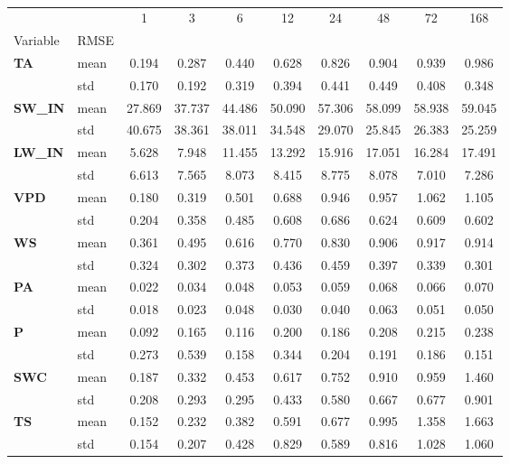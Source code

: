 \begin{table}
\centering
\caption{\CapGapLen}
\label{gap_len}
\begin{tabular}{p{2.1cm}l|cccccccc}
\toprule
 &  & 1 & 3 & 6 & 12 & 24 & 48 & 72 & 168 \\
Variable & RMSE &  &  &  &  &  &  &  &  \\
\midrule
\multirow[c]{2}{*}{\parbox{2.1cm}{\textbf{TA}}} & mean & 0.194 & 0.287 & 0.440 & 0.628 & 0.826 & 0.904 & 0.939 & 0.986 \\
 & std & 0.170 & 0.192 & 0.319 & 0.394 & 0.441 & 0.449 & 0.408 & 0.348 \\
\cline{1-10}
\multirow[c]{2}{*}{\parbox{2.1cm}{\textbf{SW\_IN}}} & mean & 27.869 & 37.737 & 44.486 & 50.090 & 57.306 & 58.099 & 58.938 & 59.045 \\
 & std & 40.675 & 38.361 & 38.011 & 34.548 & 29.070 & 25.845 & 26.383 & 25.259 \\
\cline{1-10}
\multirow[c]{2}{*}{\parbox{2.1cm}{\textbf{LW\_IN}}} & mean & 5.628 & 7.948 & 11.455 & 13.292 & 15.916 & 17.051 & 16.284 & 17.491 \\
 & std & 6.613 & 7.565 & 8.073 & 8.415 & 8.775 & 8.078 & 7.010 & 7.286 \\
\cline{1-10}
\multirow[c]{2}{*}{\parbox{2.1cm}{\textbf{VPD}}} & mean & 0.180 & 0.319 & 0.501 & 0.688 & 0.946 & 0.957 & 1.062 & 1.105 \\
 & std & 0.204 & 0.358 & 0.485 & 0.608 & 0.686 & 0.624 & 0.609 & 0.602 \\
\cline{1-10}
\multirow[c]{2}{*}{\parbox{2.1cm}{\textbf{WS}}} & mean & 0.361 & 0.495 & 0.616 & 0.770 & 0.830 & 0.906 & 0.917 & 0.914 \\
 & std & 0.324 & 0.302 & 0.373 & 0.436 & 0.459 & 0.397 & 0.339 & 0.301 \\
\cline{1-10}
\multirow[c]{2}{*}{\parbox{2.1cm}{\textbf{PA}}} & mean & 0.022 & 0.034 & 0.048 & 0.053 & 0.059 & 0.068 & 0.066 & 0.070 \\
 & std & 0.018 & 0.023 & 0.048 & 0.030 & 0.040 & 0.063 & 0.051 & 0.050 \\
\cline{1-10}
\multirow[c]{2}{*}{\parbox{2.1cm}{\textbf{P}}} & mean & 0.092 & 0.165 & 0.116 & 0.200 & 0.186 & 0.208 & 0.215 & 0.238 \\
 & std & 0.273 & 0.539 & 0.158 & 0.344 & 0.204 & 0.191 & 0.186 & 0.151 \\
\cline{1-10}
\multirow[c]{2}{*}{\parbox{2.1cm}{\textbf{SWC}}} & mean & 0.187 & 0.332 & 0.453 & 0.617 & 0.752 & 0.910 & 0.959 & 1.460 \\
 & std & 0.208 & 0.293 & 0.295 & 0.433 & 0.580 & 0.667 & 0.677 & 0.901 \\
\cline{1-10}
\multirow[c]{2}{*}{\parbox{2.1cm}{\textbf{TS}}} & mean & 0.152 & 0.232 & 0.382 & 0.591 & 0.677 & 0.995 & 1.358 & 1.663 \\
 & std & 0.154 & 0.207 & 0.428 & 0.829 & 0.589 & 0.816 & 1.028 & 1.060 \\
\cline{1-10}
\bottomrule
\end{tabular}
\end{table}
